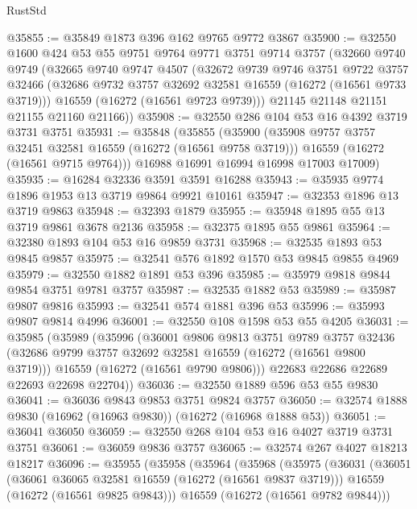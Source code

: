\begin{lexlean}{RustStd}
\begin{coremodule}
@35855 := @35849 @1873 @396 @162 @9765 @9772 @3867
@35900 := @32550
    @1600
    @424
    @53
    @55
    @9751
    @9764
    @9771
    @3751
    @9714
    @3757
    (@32660
      @9740
      @9749
      (@32665
        @9740
        @9747
        @4507
        (@32672
          @9739
          @9746
          @3751
          @9722
          @3757
          @32466
          (@32686 @9732 @3757 @32692 @32581 @16559 (@16272 (@16561 @9733 @3719)))
          @16559
          (@16272 (@16561 @9723 @9739)))
        @21145
        @21148
        @21151
        @21155
        @21160
        @21166))
@35908 := @32550 @286 @104 @53 @16 @4392 @3719 @3731 @3751
@35931 := @35848
    (@35855
      (@35900
        (@35908 @9757 @3757 @32451 @32581 @16559 (@16272 (@16561 @9758 @3719)))
        @16559
        (@16272 (@16561 @9715 @9764)))
      @16988
      @16991
      @16994
      @16998
      @17003
      @17009)
@35935 := @16284 @32336 @3591 @3591 @16288
@35943 := @35935 @9774 @1896 @1953 @13 @3719 @9864 @9921 @10161
@35947 := @32353 @1896 @13 @3719 @9863
@35948 := @32393 @1879
@35955 := @35948 @1895 @55 @13 @3719 @9861 @3678 @2136
@35958 := @32375 @1895 @55 @9861
@35964 := @32380 @1893 @104 @53 @16 @9859 @3731
@35968 := @32535 @1893 @53 @9845 @9857
@35975 := @32541 @576 @1892 @1570 @53 @9845 @9855 @4969
@35979 := @32550 @1882 @1891 @53 @396
@35985 := @35979 @9818 @9844 @9854 @3751 @9781 @3757
@35987 := @32535 @1882 @53
@35989 := @35987 @9807 @9816
@35993 := @32541 @574 @1881 @396 @53
@35996 := @35993 @9807 @9814 @4996
@36001 := @32550 @108 @1598 @53 @55 @4205
@36031 := @35985
    (@35989
      (@35996
        (@36001
          @9806
          @9813
          @3751
          @9789
          @3757
          @32436
          (@32686 @9799 @3757 @32692 @32581 @16559 (@16272 (@16561 @9800 @3719)))
          @16559
          (@16272 (@16561 @9790 @9806)))
        @22683
        @22686
        @22689
        @22693
        @22698
        @22704))
@36036 := @32550 @1889 @596 @53 @55 @9830
@36041 := @36036 @9843 @9853 @3751 @9824 @3757
@36050 := @32574 @1888 @9830 (@16962 (@16963 @9830)) (@16272 (@16968 @1888 @53))
@36051 := @36041 @36050
@36059 := @32550 @268 @104 @53 @16 @4027 @3719 @3731 @3751
@36061 := @36059 @9836 @3757
@36065 := @32574 @267 @4027 @18213 @18217
@36096 := @35955
    (@35958
      (@35964
        (@35968
          (@35975
            (@36031
              (@36051
                (@36061 @36065 @32581 @16559 (@16272 (@16561 @9837 @3719)))
                @16559
                (@16272 (@16561 @9825 @9843)))
              @16559
              (@16272 (@16561 @9782 @9844)))

\end{coremodule}
\end{lexlean}
